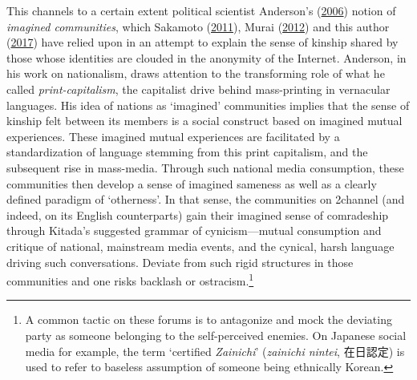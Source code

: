 \documentclass[10pt,british,A4paper,oneside]{memoir}
\begin{document}
This channels to a certain extent political scientist Anderson's
(\protect\hyperlink{ref-anderson_imagined_2006}{2006}) notion of
\emph{imagined communities}, which Sakamoto
(\protect\hyperlink{ref-sakamoto_koreans_2011}{2011}), Murai
(\protect\hyperlink{ref-murai_net_2012}{2012}) and this author
(\protect\hyperlink{ref-poppe_digitaal_2017}{2017}) have relied upon in
an attempt to explain the sense of kinship shared by those whose
identities are clouded in the anonymity of the Internet. Anderson, in his
work on nationalism, draws attention to the transforming role of what he
called \emph{print-capitalism}, the capitalist drive behind
mass-printing in vernacular languages. His idea of nations as `imagined'
communities implies that the sense of kinship felt between its members
is a social construct based on imagined mutual experiences. These
imagined mutual experiences are facilitated by a standardization of
language stemming from this print capitalism, and the subsequent rise in
mass-media. Through such national media consumption, these communities
then develop a sense of imagined sameness as well as a clearly defined
paradigm of `otherness'. In that sense, the communities on 2channel (and
indeed, on its English counterparts) gain their imagined sense of
comradeship through Kitada's suggested grammar of cynicism---mutual
consumption and critique of national, mainstream media events, and the
cynical, harsh language driving such conversations. Deviate from such
rigid structures in those communities and one risks backlash or
ostracism.\footnote{A common tactic on these forums is to antagonize and
  mock the deviating party as someone belonging to the self-perceived
  enemies. On Japanese social media for example, the term `certified
  \emph{Zainichi}' (\emph{zainichi nintei}, 在日認定) is used to refer
  to baseless assumption of someone being ethnically Korean.}
\end{document}
